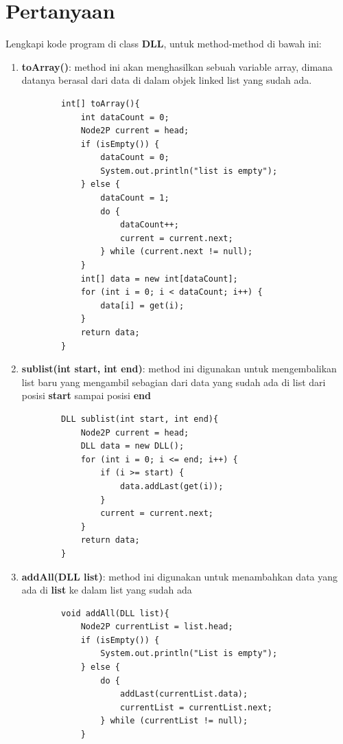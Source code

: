 \documentclass[12pt,titlepage]{article}
\begin{document}
\section*{Pertanyaan}
Lengkapi kode program di class \textbf{DLL}, untuk method-method di bawah ini:
\begin{enumerate}
    \item \textbf{toArray()}: method ini akan menghasilkan sebuah variable array, dimana datanya berasal dari data di dalam objek linked list yang sudah ada.
    \begin{verbatim}
        int[] toArray(){
            int dataCount = 0;
            Node2P current = head;
            if (isEmpty()) {
                dataCount = 0;
                System.out.println("list is empty");
            } else {
                dataCount = 1;
                do {
                    dataCount++;
                    current = current.next;
                } while (current.next != null);
            }
            int[] data = new int[dataCount];
            for (int i = 0; i < dataCount; i++) {
                data[i] = get(i);
            }
            return data;
        }
    \end{verbatim}
    \item \textbf{sublist(int start, int end)}: method ini digunakan untuk mengembalikan list baru yang mengambil sebagian dari data yang sudah ada di list dari posisi \textbf{start} sampai posisi \textbf{end}
    \begin{verbatim}
        DLL sublist(int start, int end){
            Node2P current = head;
            DLL data = new DLL();
            for (int i = 0; i <= end; i++) {
                if (i >= start) {
                    data.addLast(get(i));
                }
                current = current.next;
            }
            return data;
        }
    \end{verbatim}
    \item \textbf{addAll(DLL list)}: method ini digunakan untuk menambahkan data yang ada di \textbf{list} ke dalam list yang sudah ada
    \begin{verbatim}
        void addAll(DLL list){
            Node2P currentList = list.head;
            if (isEmpty()) {
                System.out.println("List is empty");
            } else {
                do {
                    addLast(currentList.data);
                    currentList = currentList.next;
                } while (currentList != null);
            }

\end{verbatim}
\end{enumerate}
\end{document}

